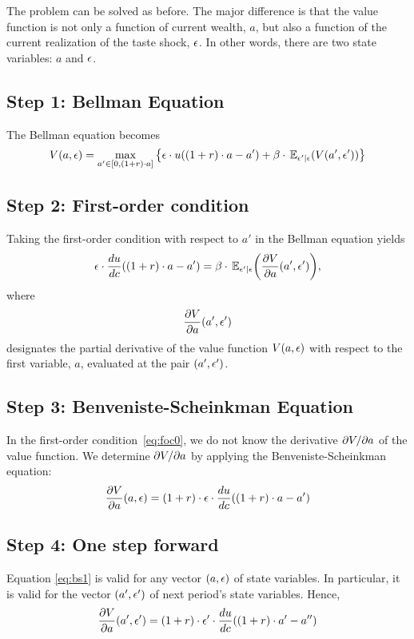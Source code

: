 \documentclass[letterpaper,12pt,leqno]{article}
\begin{document}
The problem can be solved as before. The major difference is that the value function is not only a function of current wealth, $a$, but also a function of the current realization of the taste shock, $\epsilon$. In other words, there are two state variables: $a$ and $\epsilon$.

\subsection{Step 1: Bellman Equation}

The Bellman equation becomes
\begin{equation*}
 V(a,\e)=\max_{a'\in[0,(1+r)\cdot a]} \bc{\e \cdot u((1+r)\cdot a-a')+\b\cdot \E[\e'|\e]{ V(a',\e')}}
\end{equation*}
\subsection{Step 2: First-order condition}
Taking the first-order condition with respect to $a'$ in the Bellman equation yields
\begin{equation}
\e \cdot \od{u}{c}((1+r)\cdot a-a')=\b\cdot\E[\e'|\e]{\pd{V}{a}(a',\e')},\label{eq:foc0}
\end{equation}
where 
\[\frac{\partial V}{\partial a}(a',\epsilon')\]
designates the partial derivative of the value function $V(a,\epsilon)$ with respect to the first variable, $a$, evaluated at the pair $(a',\epsilon')$.

\subsection{Step 3: Benveniste-Scheinkman Equation}

In the first-order condition~\eqref{eq:foc0}, we do not know the derivative $\partial V/\partial a$ of the value function. We determine $\partial V/\partial a$ by applying the Benveniste-Scheinkman equation:
\begin{equation}
\frac{\partial V}{\partial a}(a,\epsilon)= (1+r)\cdot  \epsilon \cdot \frac{d u}{d c}((1+r)\cdot a-a') \label{eq:bs1}
\end{equation}
\subsection{Step 4: One step forward}
Equation \eqref{eq:bs1} is valid for any vector $(a,\epsilon)$ of state variables. In particular, it is valid for the vector $(a',\epsilon')$ of next period's state variables. Hence,
\begin{equation}
\frac{\partial V}{\partial a}(a',\epsilon')= (1+r)\cdot \epsilon'\cdot \frac{d u}{d c}((1+r)\cdot a'-a'')\label{eq:onestep0}
\end{equation}
\end{document}
